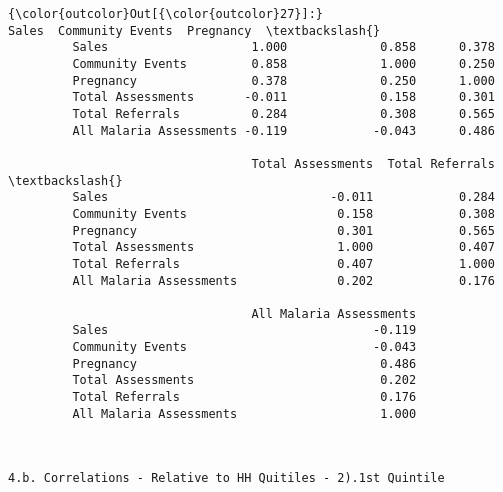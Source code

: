 \documentclass[11pt]{article}
\begin{document}
\begin{Verbatim}[commandchars=\\\{\}]
{\color{outcolor}Out[{\color{outcolor}27}]:}                          Sales  Community Events  Pregnancy  \textbackslash{}
         Sales                    1.000             0.858      0.378   
         Community Events         0.858             1.000      0.250   
         Pregnancy                0.378             0.250      1.000   
         Total Assessments       -0.011             0.158      0.301   
         Total Referrals          0.284             0.308      0.565   
         All Malaria Assessments -0.119            -0.043      0.486   
         
                                  Total Assessments  Total Referrals  \textbackslash{}
         Sales                               -0.011            0.284   
         Community Events                     0.158            0.308   
         Pregnancy                            0.301            0.565   
         Total Assessments                    1.000            0.407   
         Total Referrals                      0.407            1.000   
         All Malaria Assessments              0.202            0.176   
         
                                  All Malaria Assessments  
         Sales                                     -0.119  
         Community Events                          -0.043  
         Pregnancy                                  0.486  
         Total Assessments                          0.202  
         Total Referrals                            0.176  
         All Malaria Assessments                    1.000  
\end{Verbatim}
            
    \begin{Verbatim}[commandchars=\\\{\}]


4.b. Correlations - Relative to HH Quitiles - 2).1st Quintile

    \end{Verbatim}
\end{document}
